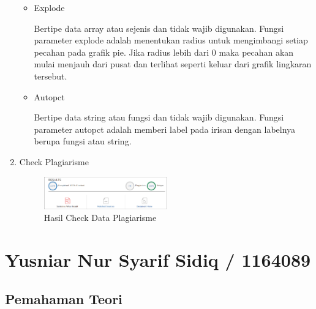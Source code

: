 \begin{enumerate}
\begin{itemize}
\item Explode
\par Bertipe data array atau sejenis dan tidak wajib digunakan. Fungsi parameter explode adalah menentukan radius untuk mengimbangi setiap pecahan pada grafik pie. Jika radius lebih dari 0 maka pecahan akan mulai menjauh dari pusat dan terlihat seperti keluar dari grafik lingkaran tersebut.

\item Autopct
\par Bertipe data string atau fungsi dan tidak wajib digunakan. Fungsi parameter autopct adalah memberi label pada irisan dengan labelnya berupa fungsi atau string. 
\end{itemize}

\item Check Plagiarisme

\begin{figure} [!htbp]
	\centerline{\includegraphics[width=0.5\textwidth]{figures/chapter6/1164074/3}}
	\caption{Hasil Check Data Plagiarisme}
	\label{data3}
\end{figure}
\end{enumerate}

\section{Yusniar Nur Syarif Sidiq / 1164089}
\subsection{Pemahaman Teori}


